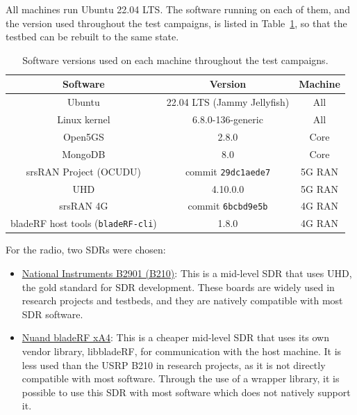 All machines run Ubuntu 22.04 LTS. The software running on each of them, and the version used throughout the test campaigns, is listed in Table~\ref{tab:software-versions}, so that the testbed can be rebuilt to the same state.

\begin{table}[htbp]
    \centering
    \begin{tabular}{|c|c|c|}
        \hline
        \textbf{Software} & \textbf{Version} & \textbf{Machine} \\
        \hline
        Ubuntu & 22.04 LTS (Jammy Jellyfish) & All \\
        \hline
        Linux kernel & 6.8.0-136-generic & All \\
        \hline
        Open5GS & 2.8.0 & Core \\
        \hline
        MongoDB & 8.0 & Core \\
        \hline
        srsRAN Project (OCUDU) & commit \texttt{29dc1aede7} & 5G \gls{RAN} \\
        \hline
        UHD & 4.10.0.0 & 5G \gls{RAN} \\
        \hline
        srsRAN 4G & commit \texttt{6bcbd9e5b} & 4G \gls{RAN} \\
        \hline
        bladeRF host tools (\texttt{bladeRF-cli}) & 1.8.0 & 4G \gls{RAN} \\
        \hline
    \end{tabular}
    \caption{Software versions used on each machine throughout the test campaigns.}
    \label{tab:software-versions}
\end{table}

For the radio, two \glspl{SDR} were chosen:
\begin{itemize}
    \item \underline {National Instruments B2901 (B210)}: This is a mid-level \gls{SDR} that uses \gls{UHD}, the gold standard for \gls{SDR} development. These boards are widely used in research projects and testbeds, and they are natively compatible with most \gls{SDR} software.
    \item \underline {Nuand bladeRF xA4}: This is a cheaper mid-level \gls{SDR} that uses its own vendor library, libbladeRF, for communication with the host machine. It is less used than the USRP B210 in research projects, as it is not directly compatible with most software. Through the use of a wrapper library, it is possible to use this \gls{SDR} with most software which does not natively support it.
\end{itemize}

